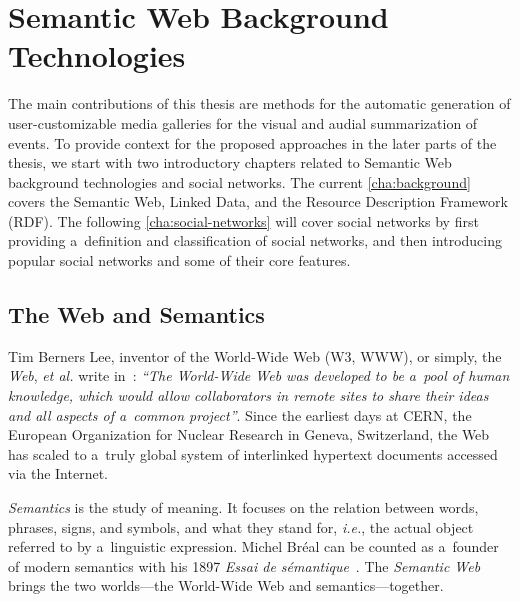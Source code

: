 \chapter{Semantic Web Background Technologies}
\label{cha:background}

\ifpdf
    \graphicspath{{2_background/figures/PNG/}{2_background/figures/PDF/}{2_background/figures/}}
\else
    \graphicspath{{2_background/figures/EPS/}{2_background/figures/}}
\fi

The main contributions of this thesis
are methods for the automatic generation of
user-customizable media galleries
for the visual and audial summarization of events.
To provide context for the proposed approaches
in the later parts of the thesis,
we start with two introductory chapters
related to Semantic Web background technologies
and social networks.
The current \autoref{cha:background} covers
the Semantic Web, Linked Data,
and the Resource Description Framework (RDF).
The following \autoref{cha:social-networks}
will cover social networks
by first providing a~definition
and classification of social networks,
and then introducing popular social networks
and some of their core features.

\section{The Web and Semantics}
Tim Berners Lee, inventor of the World-Wide Web (W3, WWW),
or simply, the \emph{Web}, \emph{et al.}
write in~\cite{bernerslee1994worldwideweb}:
\textit{``The World-Wide Web was developed
to be a~pool of human knowledge,
which would allow collaborators
in remote sites to share their ideas
and all aspects of a~common project''}.
Since the earliest days at CERN,
the European Organization for Nuclear Research
in Geneva, Switzerland,
the Web has scaled to a~truly global system
of interlinked hypertext documents
accessed via the Internet.

\emph{Semantics} is the study of meaning.
It focuses on the relation between
words, phrases, signs, and symbols,
and what they stand for, \emph{i.e.},
the actual object referred to by a~linguistic expression.
Michel Bréal can be counted as a~founder
of modern semantics with his 1897
\emph{Essai de sémantique}~\cite{breal1897essai}.
The \emph{Semantic Web} brings the two worlds---the
World-Wide Web and semantics---together.

